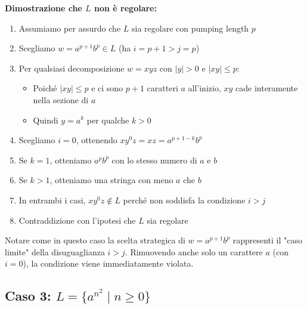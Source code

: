\documentclass[12pt,a4paper]{article}
\begin{document}
\begin{risoluzione}
\textbf{Dimostrazione che $L$ non è regolare:}
\begin{enumerate}
    \item Assumiamo per assurdo che $L$ sia regolare con pumping length $p$
    \item Scegliamo $w = a^{p+1} b^p \in L$ (ha $i = p+1 > j = p$)
    \item Per qualsiasi decomposizione $w = xyz$ con $|y| > 0$ e $|xy| \leq p$:
    \begin{itemize}
        \item Poiché $|xy| \leq p$ e ci sono $p+1$ caratteri $a$ all'inizio, $xy$ cade interamente nella sezione di $a$
        \item Quindi $y = a^k$ per qualche $k > 0$
    \end{itemize}
    \item Scegliamo $i = 0$, ottenendo $xy^0z = xz = a^{p+1-k}b^p$
    \item Se $k = 1$, otteniamo $a^p b^p$ con lo stesso numero di $a$ e $b$
    \item Se $k > 1$, otteniamo una stringa con meno $a$ che $b$
    \item In entrambi i casi, $xy^0z \not\in L$ perché non soddisfa la condizione $i > j$
    \item Contraddizione con l'ipotesi che $L$ sia regolare
\end{enumerate}
\end{risoluzione}

\begin{concettochiave}
Notare come in questo caso la scelta strategica di $w = a^{p+1}b^p$ rappresenti il "caso limite" della disuguaglianza $i > j$. Rimuovendo anche solo un carattere $a$ (con $i = 0$), la condizione viene immediatamente violata.
\end{concettochiave}

\subsection{Caso 3: $L = \{a^{n^2} \mid n \geq 0\}$}
\end{document}
